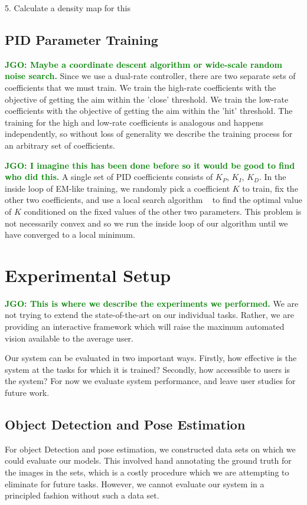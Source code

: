 \documentclass[conference]{IEEEtran}
\newcommand{\jgonote}[1]{\textcolor{Green}{\textbf{JGO: #1}}}
\begin{document}
5. Calculate a density map for this 

\subsection{PID Parameter Training}
\jgonote{Maybe a coordinate descent algorithm or wide-scale random noise search.}
Since we use a dual-rate controller, there are two separate sets of coefficients that we must train.
We train the high-rate coefficients with the objective of getting the aim within the 'close' threshold.
We train the low-rate coefficients with the objective of getting the aim within the 'hit' threshold.
The training for the high and low-rate coefficients is analogous and happens independently, so
without loss of generality we describe the training process for an arbitrary set of coefficients.

\jgonote{I imagine this has been done before so it would be good to find who did this.}
A single set of PID coefficients consists of $K_P$, $K_I$, $K_D$. In the inside loop of EM-like training, we
randomly pick a coefficient $K$ to train, fix the other two coefficients,  and use a local search 
algorithm ~\citep{} to find the optimal value of $K$ conditioned on the fixed values of the other two
parameters. This problem is not necessarily convex and so we run the inside loop of our algorithm
until we have converged to a local minimum.


\section{Experimental Setup}
\jgonote{This is where we describe the experiments we performed.}
We are not trying to extend the state-of-the-art on our individual tasks. Rather,
we are providing an interactive framework which will raise the maximum automated vision
available to the average user.

Our system can be evaluated in two important ways. Firstly, how effective is 
the system at the tasks for which it is trained? Secondly, how accessible to users is the system?
For now we evaluate system performance, and leave user studies for future work.

\subsection{Object Detection and Pose Estimation}
For object Detection and pose estimation, we constructed data
sets on which we could evaluate our models. This involved hand
annotating the ground truth for the images in the sets, which is a
costly procedure which we are attempting to eliminate for future tasks.
However, we cannot evaluate our system in a principled fashion without such
a data set.
\end{document}
